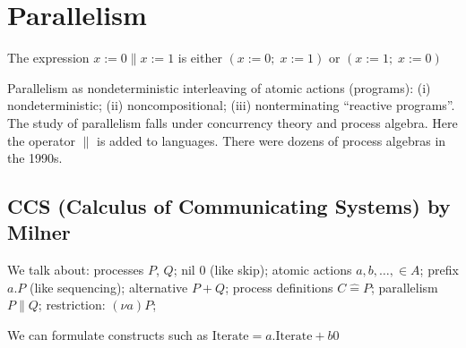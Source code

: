 {{%



\section{Parallelism}

\begin{example}
    The expression 
         $ x := 0 \parallel x := 1 $ is either $(x := 0;\; x := 1)$ or $(x := 1;\; x := 0)$
\end{example}


\begin{remark}
 Parallelism as nondeterministic interleaving of atomic actions (programs): (i) nondeterministic; (ii) noncompositional; (iii) nonterminating ``reactive programs''. The study of parallelism falls under concurrency theory and process algebra. Here the operator $\parallel$ is added to languages.
    There were dozens of process algebras in the 1990s.
\end{remark}




\subsection{CCS (Calculus of Communicating Systems) by Milner}


\begin{definition}[Syntax]
    We talk about: processes $P$, $Q$; nil $0$ (like skip);  atomic actions $a, b, \dots, \in A$;
    prefix $a.P$ (like sequencing); alternative $P + Q$; process definitions $C \hat{=} P$; 
    parallelism $P \parallel Q$; restriction: $(\nu a) P$; 
\end{definition}

\begin{example}
    We can formulate constructs such as $\mathrm{Iterate} = a.\mathrm{Iterate} +b 0$
\end{example}

}}
